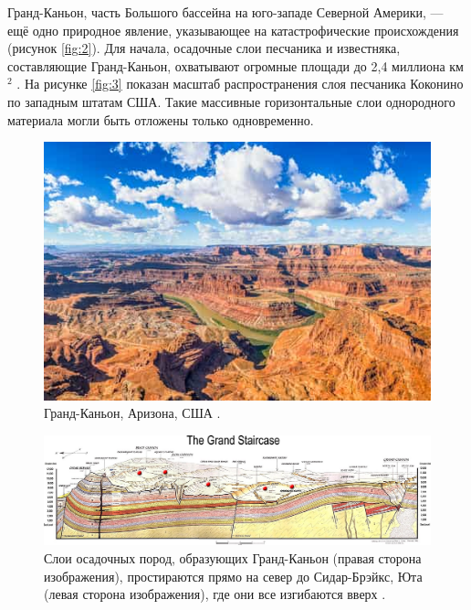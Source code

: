 \documentclass[10pt,twocolumn,letterpaper]{article}
\begin{document}
Гранд-Каньон, часть Большого бассейна на юго-западе Северной Америки, — ещё одно природное явление, указывающее на катастрофические происхождения (рисунок \ref{fig:2}). Для начала, осадочные слои песчаника и известняка, составляющие Гранд-Каньон, охватывают огромные площади до 2,4 миллиона км$^2$ \cite{21}. На рисунке \ref{fig:3} показан масштаб распространения слоя песчаника Коконино по западным штатам США. Такие массивные горизонтальные слои однородного материала могли быть отложены только одновременно.

\begin{figure}[b]
\begin{center}
   \includegraphics[width=1\linewidth]{grand-canyon.jpg}
\end{center}
   \caption{Гранд-Каньон, Аризона, США \cite{49}.}
\label{fig:2}
\label{fig:onecol}
\end{figure}

\begin{figure}[t]
\begin{center}
\includegraphics[width=1\textwidth]{Grand_Staircase-big.jpg}
\end{center}
   \caption{Слои осадочных пород, образующих Гранд-Каньон (правая сторона изображения), простираются прямо на север до Сидар-Брэйкс, Юта (левая сторона изображения), где они все изгибаются вверх \cite{50}.}
\label{fig:4}
\end{figure}
\end{document}
